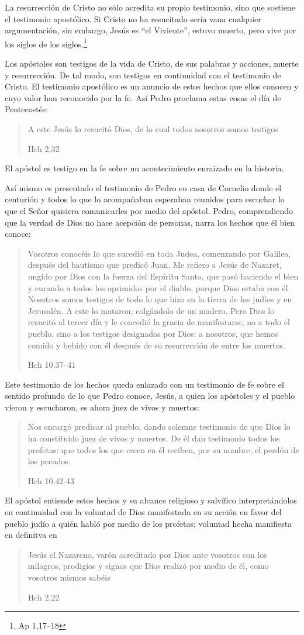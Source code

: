 La resurrección de Cristo no sólo acredita su propio testimonio, sino que
sostiene el testimonio apostólico. Si Cristo no ha resucitado sería vana
cualquier argumentación, sin embargo, Jesús es \enquote{el Viviente}, estuvo
muerto, pero vive por los siglos de los siglos.\footnote{Ap 1,17--18}

Los apóstoles son testigos de la vida de Cristo, de sus palabras y acciones,
muerte y resurrección. De tal modo, son testigos en continuidad con el
testimonio de Cristo. El testimonio apostólico es un anuncio de estos hechos que
ellos conocen y cuyo valor han reconocido por la fe. Así Pedro proclama estas
cosas el día de Pentecostés: \blockquote[Hch 2,32]{A este Jesús lo resucitó
  Dios, de lo cual todos nosotros somos testigos}. El apóstol es testigo en la
fe sobre un acontecimiento enraizado en la historia.\autocite[Cf.~][402;
406]{ninot2009tf}

Así mismo es presentado el testimonio de Pedro en casa de Cornelio donde el
centurión y todos lo que lo acompañaban esperaban reunidos para escuchar lo que
el Señor quisiera comunicarles por medio del apóstol. Pedro, comprendiendo que
la verdad de Dios no hace acepción de personas, narra los hechos que él bien
conoce:
\blockquote[Hch 10,37--41]{Vosotros conocéis lo que sucedió en toda Judea,
  comenzando por Galilea, después del bautismo que predicó Juan. Me refiero a
  Jesús de Nazaret, ungido por Dios con la fuerza del Espíritu Santo, que pasó
  haciendo el bien y curando a todos los oprimidos por el diablo, porque Dios
  estaba con él. Nosotros somos testigos de todo lo que hizo en la tierra de los
  judíos y en Jerusalén. A este lo mataron, colgándolo de un madero. Pero Dios
  lo resucitó al tercer día y le concedió la gracia de manifestarse, no a todo
  el pueblo, sino a los testigos designados por Dios: a nosotros, que hemos
  comido y bebido con él después de su resurrección de entre los muertos.}
Este testimonio de los hechos queda enlazado con un testimonio de fe sobre el
sentido profundo de lo que Pedro conoce, Jesús, a quien los apóstoles y el
pueblo vieron y escucharon, es ahora juez de vivos y muertos:
\blockquote[Hch 10,42-43]{Nos encargó predicar al pueblo, dando solemne
  testimonio de que Dios lo ha constituido juez de vivos y muertos. De él dan
  testimonio todos los profetas: que todos los que creen en él reciben, por su
  nombre, el perdón de los pecados.}

El apóstol entiende estos hechos y su alcance religioso y salvífico
interpretándolos en continuidad con la voluntad de Dios manifestada en su acción
en favor del pueblo judío a quién habló por medio de los profetas; voluntad
hecha manifiesta en definitva en \blockquote[Hch 2,22]{Jesús el Nazareno, varón
  acreditado por Dios ante vosotros con los milagros, prodigios y signos que
  Dios realizó por medio de él, como vosotros mismos sabéis}.

